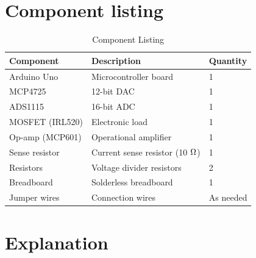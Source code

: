 \documentclass[a4paper,11pt]{article}%
\begin{document}




\section{Component listing}



\begin{table}[H]
\centering
\caption{Component Listing}
\begin{tabular}{|l|l|l|}
\hline
\textbf{Component} & \textbf{Description} & \textbf{Quantity} \\ \hline
Arduino Uno & Microcontroller board & 1 \\ \hline
MCP4725 & 12-bit DAC & 1 \\ \hline
ADS1115 & 16-bit ADC & 1 \\ \hline
MOSFET (IRL520) & Electronic load & 1 \\ \hline
Op-amp (MCP601) & Operational amplifier & 1 \\ \hline
Sense resistor & Current sense resistor (10 $\ohm$) & 1 \\ \hline
Resistors & Voltage divider resistors & 2 \\ \hline
Breadboard & Solderless breadboard & 1 \\ \hline
Jumper wires & Connection wires & As needed \\ \hline
\end{tabular}
\end{table}



\section{Explanation}
\end{document}
